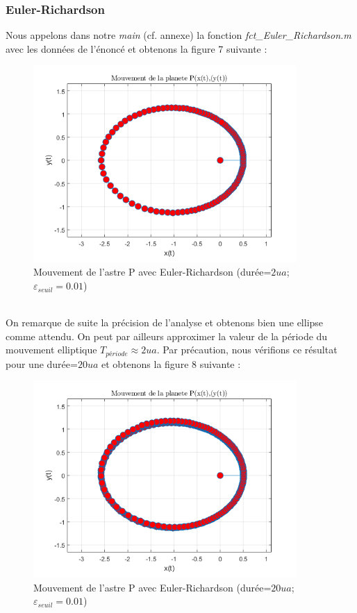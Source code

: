 \documentclass[11pt]{article} %
\begin{document}
\subsubsection{Euler-Richardson}
Nous appelons dans notre \textit{main} (cf. annexe) la fonction \textit{fct\_Euler\_Richardson.m} avec les données de l'énoncé et obtenons la figure 7 suivante :
\begin{figure}[h]
\includegraphics[width=10cm]{fig_euler_rich_1}
\centering
\caption{Mouvement de l'astre P avec Euler-Richardson (durée=$2ua$; $\varepsilon_{seuil}=0.01$)}
\end{figure}
\\On remarque de suite la précision de l'analyse et obtenons bien une ellipse comme attendu. On peut par ailleurs approximer la valeur de la période du mouvement elliptique $T_{période} \approx 2ua$. Par précaution, nous vérifions ce résultat pour une durée=$20 ua$ et obtenons la figure 8 suivante :
\begin{figure}[h]
\includegraphics[width=10cm]{fig_euler_rich_2}
\centering
\caption{Mouvement de l'astre P avec Euler-Richardson (durée=$20ua$; $\varepsilon_{seuil}=0.01$)}
\end{figure}
\end{document}
